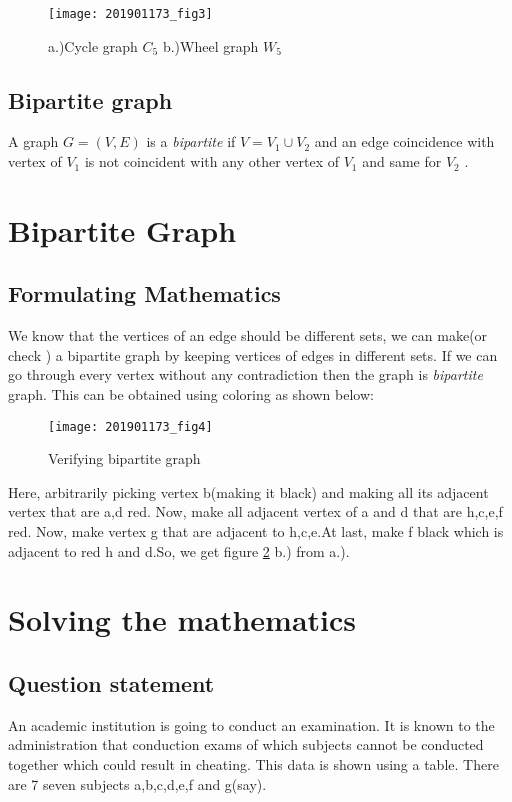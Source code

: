 \documentclass{article}
\begin{document}
\begin{figure}[h]
    \centering
    \texttt{[image: 201901173\_fig3]}
    \caption{a.)Cycle graph $C_5$  b.)Wheel graph $W_5$}
    \label{fig:201901173_fig3}
\end{figure}

\subsection{Bipartite graph}
A graph $G = (V,E)$ is a {\it bipartite} if $V = V_1 \cup V_2 $ and an edge coincidence with vertex of $V_1$ is not coincident with any other vertex of $V_1$ and same for $V_2$ .

\vspace{2cm}

\section{Bipartite Graph}

\subsection{Formulating Mathematics}
We know that the vertices of an edge should be different sets, we can make(or check ) a bipartite graph by keeping vertices of edges in different sets. If we can go through every vertex without any contradiction then the graph is {\it bipartite} graph. This can be obtained using coloring as shown below:

\begin{figure}[h]
    \texttt{[image: 201901173\_fig4]}
    \caption{Verifying bipartite graph}
    \label{fig:201901173_fig4}
\end{figure}

Here, arbitrarily picking vertex b(making it black) and making all its adjacent vertex that are a,d red. Now, make all adjacent vertex of a and d that are h,c,e,f red. Now, make vertex g that are adjacent to h,c,e.At last, make f black which is adjacent to red h and d.So, we get figure \ref{fig:201901173_fig4} b.) from a.).

\section{Solving the mathematics}

\subsection{Question statement}
An academic institution is going to conduct an examination. It is known to the administration that conduction exams of which subjects cannot be conducted together which could result in cheating. This data is shown using a table. There are 7 seven subjects a,b,c,d,e,f and g(say).
\end{document}
